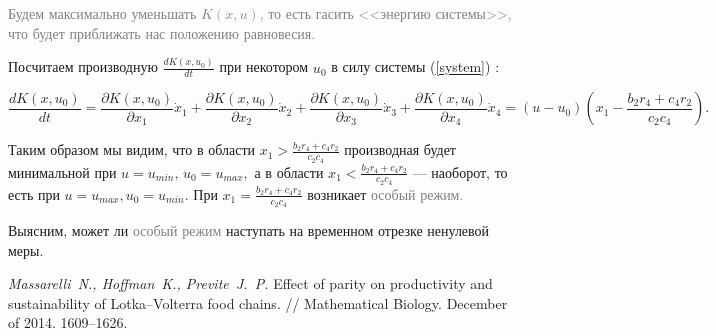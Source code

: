 \documentclass[11pt]{article}
\newcommand\Set[2]{\left\{ #1 \mid #2 \right\}}
\newcommand\Ref[1]{(\ref{#1})}
\newcommand\RS{\Ref{system} }
\newcommand\beq{\begin{equation}}
\newcommand\eeq{\end{equation}}
\newcommand\dd[2]{\frac{\partial#1}{\partial#2}}
\begin{document}
%
%

\textcolor{gray}{Будем максимально уменьшать $K(x,u)$, то есть гасить <<энергию системы>>, что будет приближать нас  положению равновесия.\\}

Посчитаем производную $\frac{dK(x,u_0)}{dt}$ при некотором $u_0$ в силу системы \RS:

$$\frac{dK(x,u_0)}{dt} = \dd{K(x,u_0)}{x_1}\dot x_1 + \dd{K(x,u_0)}{x_2}\dot x_2 + \dd{K(x,u_0)}{x_3}\dot x_3 + \dd{K(x,u_0)}{x_4}\dot x_4 = (u - u_0)\left(x_1 - \frac{b_2r_4 + c_4r_2}{c_2c_4}\right).$$

Таким образом мы видим, что в области $x_1 > \frac{b_2r_4 + c_4r_2}{c_2c_4}$ производная будет минимальной при $u = u_{min}, \, u_0 = u_{max},$ а в области $x_1 < \frac{b_2r_4 + c_4r_2}{c_2c_4}$ --- наоборот, то есть при $u = u_{max}, u_0 = u_{min}.$ При $x_1 = \frac{b_2r_4 + c_4r_2}{c_2c_4}$ возникает \textcolor{gray}{особый режим.}

Выясним, может ли \textcolor{gray}{особый режим} наступать на временном отрезке ненулевой меры.




\clearpage
\newpage
\begin{thebibliography}{0}
 {\it Massarelli~N., Hoffman~K., Previte~J.~P.} Effect of parity on productivity and sustainability of Lotka–Volterra food chains. // Mathematical Biology. December of 2014. 1609--1626.
\end{thebibliography}
\end{document}
